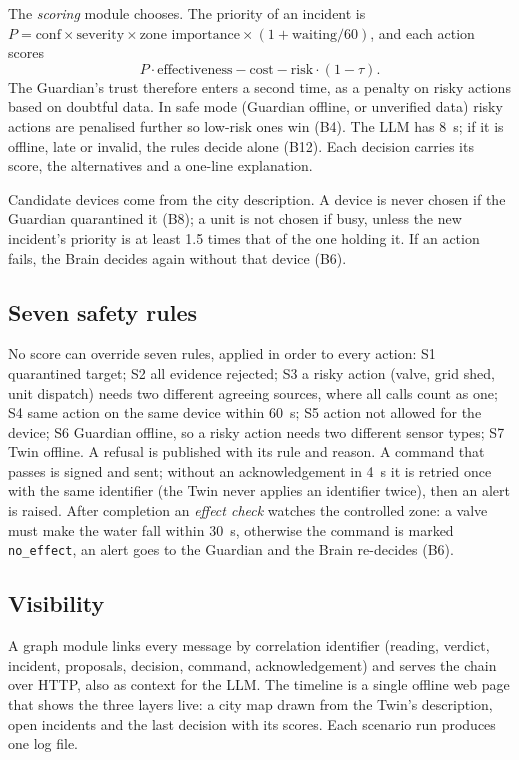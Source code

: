 \documentclass[conference]{IEEEtran}
\newcommand{\code}[1]{\texttt{\small #1}}
\begin{document}
The \emph{scoring} module chooses. The priority of an incident is
$P=\text{conf}\times\text{severity}\times\text{zone importance}\times(1+\text{waiting}/60)$, and each action scores
\begin{equation}
P\cdot\text{effectiveness} - \text{cost} - \text{risk}\cdot(1-\tau).
\end{equation}
The Guardian's trust therefore enters a second time, as a penalty on risky actions based on doubtful data. In safe mode
(Guardian offline, or unverified data) risky actions are penalised further so low-risk ones win (B4). The LLM has 8~s; if it is
offline, late or invalid, the rules decide alone (B12). Each decision carries its score, the alternatives and a one-line
explanation.

Candidate devices come from the city description. A device is never chosen if the Guardian quarantined it (B8); a unit is not
chosen if busy, unless the new incident's priority is at least 1.5 times that of the one holding it. If an action fails, the Brain
decides again without that device (B6).

\subsection{Seven safety rules}
No score can override seven rules, applied in order to every action: S1 quarantined target; S2 all evidence rejected; S3 a
risky action (valve, grid shed, unit dispatch) needs two different agreeing sources, where all calls count as one; S4 same
action on the same device within 60~s; S5 action not allowed for the device; S6 Guardian offline, so a risky action needs two
different sensor types; S7 Twin offline. A refusal is published with its rule and reason. A command that passes is signed and
sent; without an acknowledgement in 4~s it is retried once with the same identifier (the Twin never applies an identifier twice),
then an alert is raised. After completion an \emph{effect check} watches the controlled zone: a valve must make the water fall
within 30~s, otherwise the command is marked \code{no\_effect}, an alert goes to the Guardian and the Brain re-decides (B6).

\subsection{Visibility}
A graph module links every message by correlation identifier (reading, verdict, incident, proposals, decision, command,
acknowledgement) and serves the chain over HTTP, also as context for the LLM. The timeline is a single offline web page that
shows the three layers live: a city map drawn from the Twin's description, open incidents and the last decision with its
scores. Each scenario run produces one log file.
\end{document}
